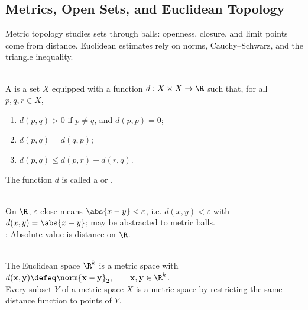 \subsection{Metrics, Open Sets, and Euclidean Topology}\label{subsec:metric-spaces-and-euclidean-topology}

%


Metric topology studies sets through balls: openness, closure, and limit points come from distance. Euclidean estimates rely on norms, Cauchy--Schwarz, and the triangle inequality.

\begin{definition} \label{def:metric-space} \\
A  is a set $X$ equipped with a function $d:X\times X\to\R$ such that, for all $p,q,r\in X$,
\begin{enumerate}[label=\roman*.]
\setlength{\itemsep}{0pt}
\item $d(p,q)>0$ if $p\neq q$, and $d(p,p)=0$;
\item $d(p,q)=d(q,p)$;
\item $d(p,q)\leq d(p,r)+d(r,q)$.
\end{enumerate}
The function $d$ is called a  or .
\end{definition}

\begin{perspective} \label{per:epsilon-closeness-to-metric-language} \\
On $\R$, $\varepsilon$-close means $\abs{x-y}<\varepsilon$, i.e. $d(x,y)<\varepsilon$ with $d(x,y)=\abs{x-y}$; may be abstracted to metric balls.\\
: Absolute value is distance on $\R$.
\end{perspective}

\begin{example} \label{ex:euclidean-metric-and-subspaces} \\
The Euclidean space $\R^k$ is a metric space with $d(\mathbf{x},\mathbf{y})\defeq\norm{\mathbf{x}-\mathbf{y}}_2,\qquad \mathbf{x},\mathbf{y}\in\R^k$.\\
Every subset $Y$ of a metric space $X$ is a metric space by restricting the same distance function to points of $Y$.
\end{example}

